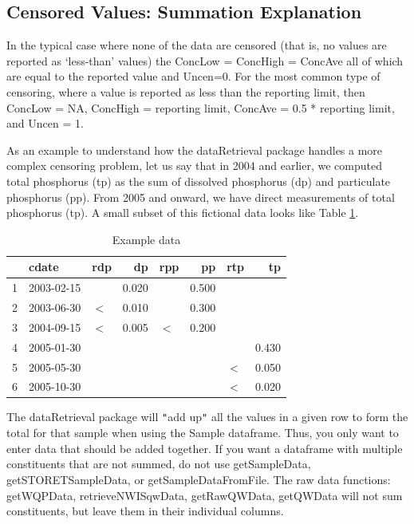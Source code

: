 \documentclass[a4paper,11pt]{article}\usepackage[]{graphicx}\usepackage[]{color}
\begin{document}
\FloatBarrier


\subsection{Censored Values: Summation Explanation}
In the typical case where none of the data are censored (that is, no values are reported as `less-than' values) the ConcLow = ConcHigh = ConcAve all of which are equal to the reported value and Uncen=0.  For the most common type of censoring, where a value is reported as less than the reporting limit, then ConcLow = NA, ConcHigh = reporting limit, ConcAve = 0.5 * reporting limit, and Uncen = 1.

As an example to understand how the dataRetrieval package handles a more complex censoring problem, let us say that in 2004 and earlier, we computed total phosphorus (tp) as the sum of dissolved phosphorus (dp) and particulate phosphorus (pp). From 2005 and onward, we have direct measurements of total phosphorus (tp). A small subset of this fictional data looks like Table \ref{tab:exampleComplexQW}.



\begin{table}[ht]
\centering
\begin{tabular}{rllrlrlr}
  \hline
 & cdate & rdp & dp & rpp & pp & rtp & tp \\ 
  \hline
1 & 2003-02-15 &  & 0.020 &  & 0.500 &  &  \\ 
  2 & 2003-06-30 & $<$ & 0.010 &  & 0.300 &  &  \\ 
  3 & 2004-09-15 & $<$ & 0.005 & $<$ & 0.200 &  &  \\ 
  4 & 2005-01-30 &  &  &  &  &  & 0.430 \\ 
  5 & 2005-05-30 &  &  &  &  & $<$ & 0.050 \\ 
  6 & 2005-10-30 &  &  &  &  & $<$ & 0.020 \\ 
   \hline
\end{tabular}
\caption{Example data} 
\label{tab:exampleComplexQW}
\end{table}



The dataRetrieval package will \texttt{"}add up\texttt{"} all the values in a given row to form the total for that sample when using the Sample dataframe. Thus, you only want to enter data that should be added together. If you want a dataframe with multiple constituents that are not summed, do not use getSampleData, getSTORETSampleData, or getSampleDataFromFile. The raw data functions: getWQPData, retrieveNWISqwData, getRawQWData, getQWData will not sum constituents, but leave them in their individual columns. 
\end{document}
